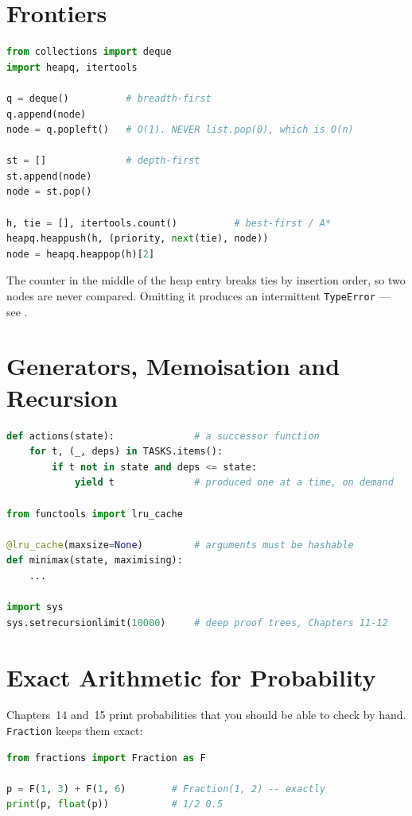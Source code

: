 \section{Frontiers}

\begin{lstlisting}[language=Python]
from collections import deque
import heapq, itertools

q = deque()          # breadth-first
q.append(node)
node = q.popleft()   # O(1). NEVER list.pop(0), which is O(n)

st = []              # depth-first
st.append(node)
node = st.pop()

h, tie = [], itertools.count()          # best-first / A*
heapq.heappush(h, (priority, next(tie), node))
node = heapq.heappop(h)[2]
\end{lstlisting}
The counter in the middle of the heap entry breaks ties by insertion order, so two
nodes are never compared. Omitting it produces an intermittent
\texttt{TypeError} --- see .

\section{Generators, Memoisation and Recursion}

\begin{lstlisting}[language=Python]
def actions(state):              # a successor function
    for t, (_, deps) in TASKS.items():
        if t not in state and deps <= state:
            yield t              # produced one at a time, on demand

from functools import lru_cache

@lru_cache(maxsize=None)         # arguments must be hashable
def minimax(state, maximising):
    ...

import sys
sys.setrecursionlimit(10000)     # deep proof trees, Chapters 11-12
\end{lstlisting}

\section{Exact Arithmetic for Probability}

Chapters~14 and~15 print probabilities that you should be able to check by hand.
\texttt{Fraction} keeps them exact:
\begin{lstlisting}[language=Python]
from fractions import Fraction as F

p = F(1, 3) + F(1, 6)        # Fraction(1, 2) -- exactly
print(p, float(p))           # 1/2 0.5
\end{lstlisting}

